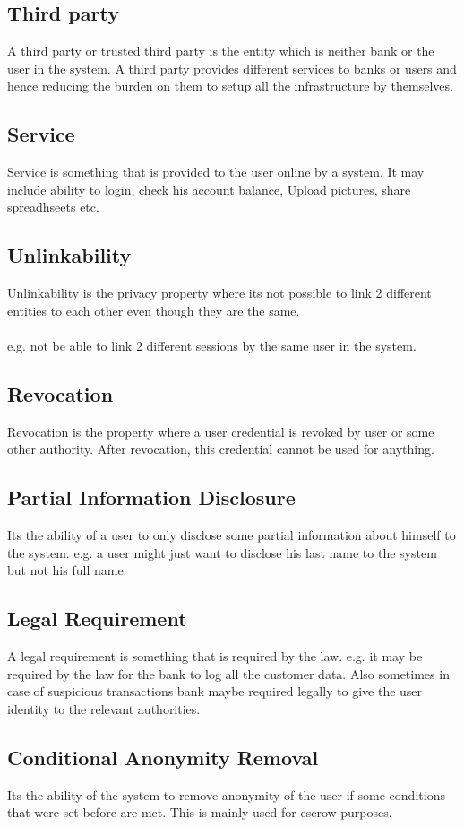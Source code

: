 \subsection{Third party}
A third party or trusted third party is the entity which is neither bank or the user in the system. A third party provides different services to banks or users and hence reducing the burden on them to setup all the infrastructure by themselves.
\subsection{Service}
Service is something that is provided to the user online by a system. It may include ability to login, check his account balance, Upload pictures, share spreadhseets etc.
\subsection{Unlinkability}
Unlinkability is the privacy property where its not possible to link 2 different entities to each other even though they are the same. 
\\
\\e.g. not be able to link 2 different sessions by the same user in the system.
\subsection{Revocation}
Revocation is the property where a user credential is revoked by user or some other authority. After revocation, this credential cannot be used for anything.
\subsection{Partial Information Disclosure}
Its the ability of a user to only disclose some partial information about himself to the system. e.g. a user might just want to disclose his last name to the system but not his full name.
\subsection{Legal Requirement}
A legal requirement is something that is required by the law. e.g. it may be required by the law for the bank to log all the customer data. Also sometimes in case of suspicious transactions bank maybe required legally to give the user identity to the relevant authorities.
\subsection{Conditional Anonymity Removal}
Its the ability of the system to remove anonymity of the user if some conditions that were set before are met. This is mainly used for escrow purposes.


